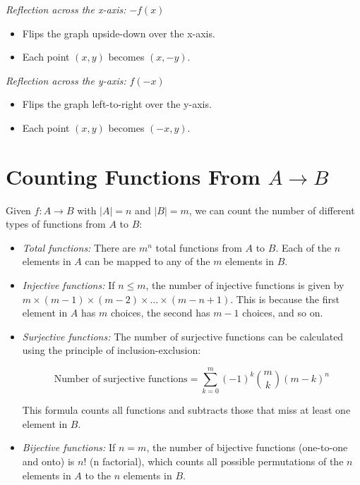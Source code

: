 \emph{Reflection across the x-axis:} \( -f(x) \)
	
\begin{itemize}

	\item Flips the graph upside-down over the x-axis.

	\item Each point \( (x, y) \) becomes \( (x, -y) \).

\end{itemize}

\emph{Reflection across the y-axis:} \( f(-x) \)

\begin{itemize}

	\item Flips the graph left-to-right over the y-axis.

	\item Each point \( (x, y) \) becomes \( (-x, y) \).

\end{itemize}

\section{Counting Functions From \texorpdfstring{\(A \to B\)}{A to B}}

Given \(f: A \to B\) with \(|A| = n\) and \(|B| = m\), we can count the number of different types of functions from 
\(A\) to \(B\):

\begin{itemize}

	\item \emph{Total functions:} There are \(m^n\) total functions from \(A\) to \(B\). Each of the \(n\) elements in 
		  \(A\) can be mapped to any of the \(m\) elements in \(B\).

	\item \emph{Injective functions:} If \(n \leq m\), the number of injective functions is given by 
	\(m \times (m-1) \times (m-2) \times \ldots \times (m-n+1)\). This is because the first element in \(A\) has \(m\) choices, the second has \(m-1\)
	choices, and so on.

	\item \emph{Surjective functions:} The number of surjective functions can be calculated using the 
		  principle of inclusion-exclusion:
		  
		  \[
			  \text{Number of surjective functions} = \sum_{k=0}^{m} (-1)^k \binom{m}{k} (m-k)^n
		  \]
		  
		  This formula counts all functions and subtracts those that miss at least one element in \(B\). 

	\item \emph{Bijective functions:} If \(n = m\), the number of bijective functions (one-to-one and onto) is 
		  \(n!\) (n factorial), which counts all possible permutations of the \(n\) elements in \(A\) to the \(n\) elements in \(B\).

\end{itemize}

